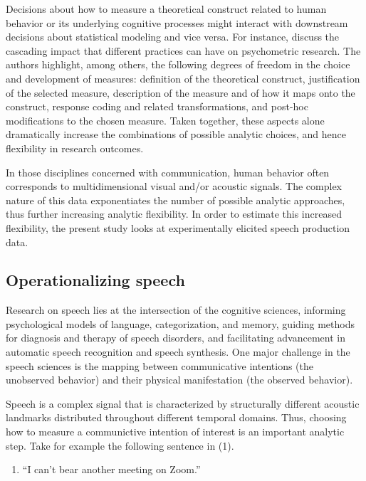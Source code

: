 \documentclass[Review,times,sageh]{sagej}
\providecommand{\tightlist}{\setlength{\itemsep}{0pt}\setlength{\parskip}{0pt}}
\begin{document}
Decisions about how to measure a theoretical construct related to human behavior or its underlying cognitive processes might interact with downstream decisions about statistical modeling and vice versa.
For instance, \citet{flake2020} discuss the cascading impact that different practices can have on psychometric research.
The authors highlight, among others, the following degrees of freedom in the choice and development of measures: definition of the theoretical construct, justification of the selected measure, description of the measure and of how it maps onto the construct, response coding and related transformations, and post-hoc modifications to the chosen measure.
Taken together, these aspects alone dramatically increase the combinations of possible analytic choices, and hence flexibility in research outcomes.

In those disciplines concerned with communication, human behavior often corresponds to multidimensional visual and/or acoustic signals.
The complex nature of this data exponentiates the number of possible analytic approaches, thus further increasing analytic flexibility.
In order to estimate this increased flexibility, the present study looks at experimentally elicited speech production data.\\

\hypertarget{s:operspeech}{%
\subsection{Operationalizing speech}\label{s:operspeech}}

Research on speech lies at the intersection of the cognitive sciences, informing psychological models of language, categorization, and memory, guiding methods for diagnosis and therapy of speech disorders, and facilitating advancement in automatic speech recognition and speech synthesis.
One major challenge in the speech sciences is the mapping between communicative intentions (the unobserved behavior) and their physical manifestation (the observed behavior).

Speech is a complex signal that is characterized by structurally different acoustic landmarks distributed throughout different temporal domains.
Thus, choosing how to measure a communictive intention of interest is an important analytic step.
Take for example the following sentence in (1).

\vspace{1em}

\begin{enumerate}
\def\labelenumi{(\arabic{enumi})}
\tightlist
\item
  ``I can't bear another meeting on Zoom.''
  \vspace{1em}
\end{enumerate}
\end{document}
